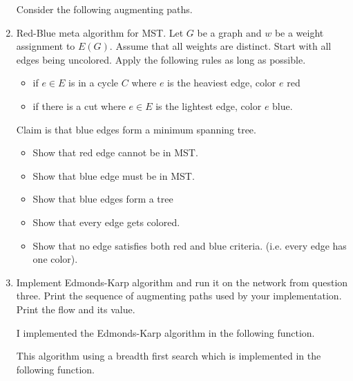 \documentclass[11pt, oneside]{article}
\begin{document}
\begin{enumerate}
    Consider the following augmenting paths.

  \item %
    Red-Blue meta algorithm for MST.
    Let $G$ be a graph and $w$ be a weight assignment to $E(G)$.
    Assume that all weights are distinct.
    Start with all edges being uncolored.
    Apply the following rules as long as possible.
    \begin{itemize}
      \item if $e \in E$ is in a cycle $C$ where $e$ is the heaviest edge, color $e$ red
      \item if there is a cut where $e\in E$ is the lightest edge, color $e$ blue.
    \end{itemize}
    Claim is that blue edges form a minimum spanning tree.
    \begin{itemize}
      \item Show that red edge cannot be in MST.
      \item Show that blue edge must be in MST.
      \item Show that blue edges form a tree
      \item Show that every edge gets colored.
      \item Show that no edge satisfies both red and blue criteria. (i.e. every edge has one color).
    \end{itemize}

  \item %
    Implement Edmonds-Karp algorithm and run it on the network from question three.
    Print the sequence of augmenting paths used by your implementation.
    Print the flow and its value.

    I implemented the Edmonds-Karp algorithm in the following function.
    

    This algorithm using a breadth first search which is implemented in the
    following function.
    


\end{enumerate}
\end{document}
